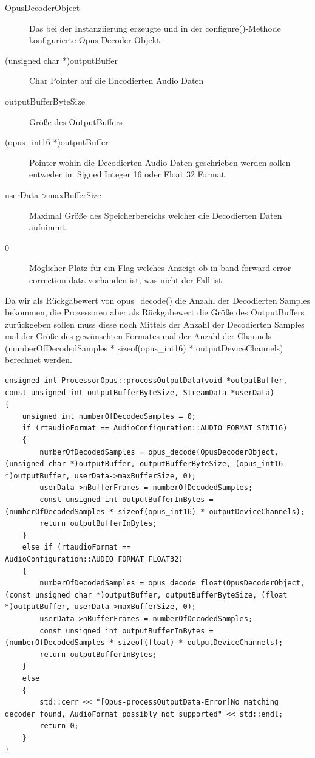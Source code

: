 \begin{description}
\item[OpusDecoderObject] Das bei der Instanziierung erzeugte und in der configure()-Methode konfigurierte Opus Decoder Objekt.
\item[(unsigned char *)outputBuffer] Char Pointer auf die Encodierten Audio Daten
\item[outputBufferByteSize] Größe des OutputBuffers
\item[(opus\_int16 *)outputBuffer] Pointer wohin die Decodierten Audio Daten geschrieben werden sollen entweder im Signed Integer 16 oder Float 32 Format.
\item[userData->maxBufferSize] Maximal Größe des Speicherbereichs welcher die Decodierten Daten aufnimmt.
\item[0] Möglicher Platz für ein Flag welches Anzeigt ob in-band forward error correction data vorhanden ist, was nicht der Fall ist.
\end{description}

Da wir als Rückgabewert von opus\_decode() die Anzahl der Decodierten Samples bekommen, die Prozessoren aber als Rückgabewert die Größe des OutputBuffers zurückgeben sollen muss diese noch Mittels der Anzahl der Decodierten Samples mal der Größe des gewünschten Formates mal der Anzahl der Channels (numberOfDecodedSamples * sizeof(opus\_int16) * outputDeviceChannels) berechnet werden.

\begin{lstlisting}[caption={Decodieren von Audio Daten mittels Opus},label={Code:Opus}]
unsigned int ProcessorOpus::processOutputData(void *outputBuffer, const unsigned int outputBufferByteSize, StreamData *userData)
{
    unsigned int numberOfDecodedSamples = 0;
    if (rtaudioFormat == AudioConfiguration::AUDIO_FORMAT_SINT16)
    {
        numberOfDecodedSamples = opus_decode(OpusDecoderObject, (unsigned char *)outputBuffer, outputBufferByteSize, (opus_int16 *)outputBuffer, userData->maxBufferSize, 0);
        userData->nBufferFrames = numberOfDecodedSamples;
        const unsigned int outputBufferInBytes = (numberOfDecodedSamples * sizeof(opus_int16) * outputDeviceChannels);
        return outputBufferInBytes;
    }
    else if (rtaudioFormat == AudioConfiguration::AUDIO_FORMAT_FLOAT32)
    {
        numberOfDecodedSamples = opus_decode_float(OpusDecoderObject, (const unsigned char *)outputBuffer, outputBufferByteSize, (float *)outputBuffer, userData->maxBufferSize, 0);
        userData->nBufferFrames = numberOfDecodedSamples;
        const unsigned int outputBufferInBytes = (numberOfDecodedSamples * sizeof(float) * outputDeviceChannels);
        return outputBufferInBytes;
    }
    else
    {
        std::cerr << "[Opus-processOutputData-Error]No matching decoder found, AudioFormat possibly not supported" << std::endl;
        return 0;
    }
}
\end{lstlisting}

